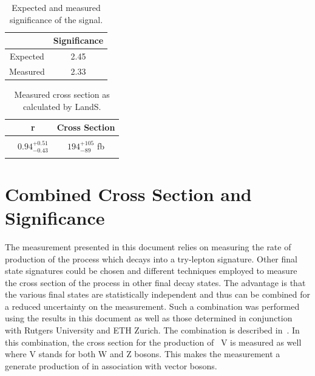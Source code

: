  
 
\begin{table}[ht!]
\caption{ \label{tab:significance} Expected and measured significance of the signal.}
\begin{center}
\begin{tabular}{c|c}\hline
	& Significance	 \\ \hline
Expected	& 2.45	 \\
Measured	& 2.33	 \\
\hline
\end{tabular}
\end{center}
\end{table}
 
\begin{table}[ht!]
\caption{ \label{tab:landsout} Measured cross section as calculated by LandS.}
\begin{center}
\begin{tabular}{c|cc}\hline
	& r        & Cross Section	 \\ \hline
	&  & \\
\ttZ	& $0.94 _{-0.43} ^{+0.51}$ & 	$194 _{-89} ^{+105}$ fb\\
& & \\
\hline
\end{tabular}
\end{center}
\end{table}
 
 
 
 
 
 
 
 \clearpage
 
 
 \section{Combined Cross Section and Significance}
 The measurement presented in this document relies on measuring the rate of production of the \ttZ process which decays into a try-lepton signature. Other final state signatures could be chosen and different techniques employed to measure the cross section of the \ttZ process in other final decay states. The advantage is that the various final states are statistically independent and thus can be combined for a reduced uncertainty on the measurement. Such a combination was performed using the results in this document as well as those determined in conjunction with Rutgers University and ETH Zurich. The combination is described in~\cite{ttV_combination}. In this combination, the cross section for the production of \ttbar~V is measured as well where V stands for both W and Z bosons. This makes the measurement a generate production of \ttbar in association with vector bosons.\\
 
